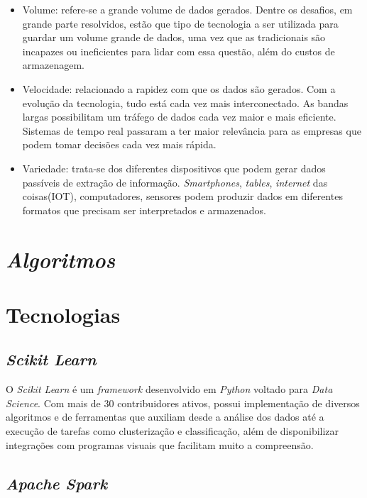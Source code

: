 \begin{itemize}
  \item Volume: refere-se a grande volume de dados gerados. Dentre os desafios, em grande parte resolvidos, estão que tipo de tecnologia a ser utilizada para guardar um volume grande de dados, uma vez que as tradicionais são incapazes ou ineficientes para lidar com essa questão, além do custos de armazenagem.
  \item Velocidade: relacionado a rapidez com que os dados são gerados. Com a evolução da tecnologia, tudo está cada vez mais interconectado. As bandas largas possibilitam um tráfego de dados cada vez maior e mais eficiente. Sistemas de tempo real passaram a ter maior relevância para as empresas que podem tomar decisões cada vez mais rápida.
  \item Variedade: trata-se dos diferentes dispositivos que podem gerar dados passíveis de extração de informação. \emph{Smartphones}, \emph{tables}, \emph{internet} das coisas(IOT), computadores, sensores podem produzir dados em diferentes formatos que precisam ser interpretados e armazenados.
\end{itemize}


\section{\emph{Algoritmos}}








\section{Tecnologias}

\subsection{\emph{Scikit Learn}}

O \emph{Scikit Learn} é um \emph{framework} desenvolvido em \emph{Python} voltado para \emph{Data Science}. Com mais de 30 contribuidores ativos, possui implementação de diversos algoritmos e de ferramentas que auxiliam desde a análise dos dados até a execução de tarefas como clusterização e classificação, além de disponibilizar integrações com programas visuais que facilitam muito a compreensão. 


\subsection{\emph{Apache Spark}}

